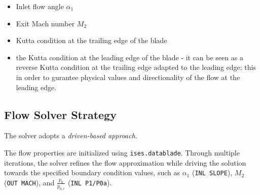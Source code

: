 \begin{itemize}
    \item Inlet flow angle $\alpha_1$
    \item Exit Mach number $M_2$
    \item Kutta condition at the trailing edge of the blade
    \item the Kutta condition at the leading edge of the blade - it can be seen as a reverse
    Kutta condition at the trailing edge adapted to the leading edge: this in order to
    gurantee physical values and directionality of the flow at the leading edge.
\end{itemize}

\subsection{Flow Solver Strategy}





The solver adopts a \textit{driven-based approach}.

The flow properties are initialized using \texttt{ises.datablade}. 
Through multiple iterations, the solver refines the flow approximation while driving the solution towards the specified boundary condition values, such as $\alpha_1$ (\texttt{INL SLOPE}), $M_2$ (\texttt{OUT MACH}), and $\frac{p_0}{p_{0,r}}$ (\texttt{INL P1/P0a}). 


